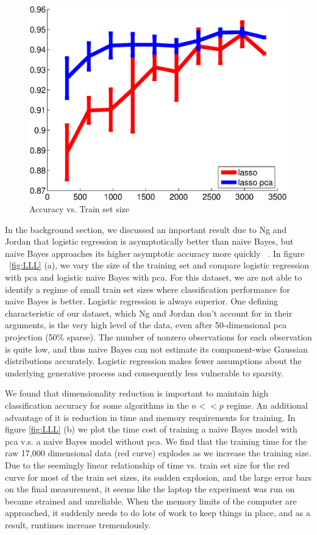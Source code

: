 \begin{center}
\begin{figure}[!ht]
\centering
\includegraphics[width=.5\textwidth]{../images/_lasso_lasso_pca_acc.eps}
\caption{Accuracy vs. Train set size}
\par
\label{fig:lassoCompare}
\end{figure}
\end{center}

	In the background section, we discussed an important result due to Ng and Jordan that logistic regression is asymptotically better than naive Bayes, but naive Bayes approaches its higher asymptotic accuracy more quickly ~\cite{jordan2002discriminative}. In figure ~\ref{fig:LLL} (a), we vary the size of the training set and compare logistic regression with pca and logistic naive Bayes with pca. For this dataset, we are not able to identify a regime of small train set sizes where classification performance for naive Bayes is better. Logistic regression is always superior. One defining characteristic of our dataset, which Ng and Jordan don't account for in their arguments, is the very high level of the data, even after 50-dimensional pca projection (50\% sparse). The number of nonzero observations for each observation is quite low, and thus naive Bayes can not estimate its component-wise Gaussian distributions accurately. Logistic regression makes fewer assumptions about the underlying generative process and consequently less vulnerable to sparsity. 

	We found that dimensionality reduction is important to maintain high classification accuracy for some algorithms in the $n << p$ regime. An additional advantage of it is reduction in time and memory requirements for training. In figure \ref{fig:LLL} (b) we plot the time cost of training a naive Bayes model with pca v.s. a naive Bayes model without pca. We find that the training time for the raw 17,000 dimensional data (red curve) explodes as we increase the training size. Due to the seemingly linear relationship of time vs. train set size for the red curve for most of the train set sizes, its sudden explosion, and the large error bars on the final measurement, it seems like the laptop the experiment was run on became strained and unreliable. When the memory limits of the computer are approached, it suddenly needs to do lots of work to keep things in place, and as a result, runtimes increase tremendously. 


